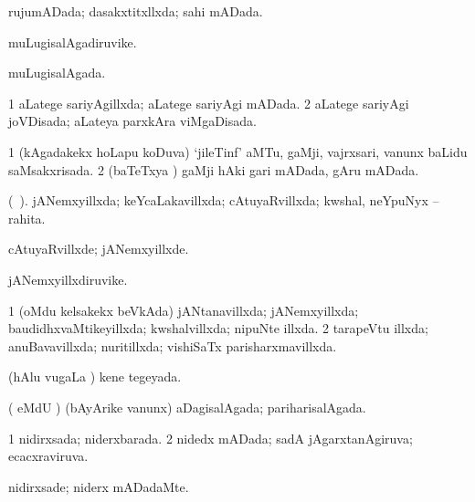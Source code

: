 {{\bentry
{} 
\gl{\gu}
\expl{}
\bmng
rujumADada; dasakxtitxllxda; sahi mADada. 
\emng
\eentry

\bentry
{} 
\gl{\nA}
\expl{}
\bmng
muLugisalAgadiruvike. 
\emng
\eentry

\bentry
{} 
\gl{\gu}
\expl{}
\bmng
muLugisalAgada. 
\emng
\eentry

\bentry
{} 
\gl{\gu}
\expl{}
\bmng
\bnum
\num{1} aLatege sariyAgillxda; aLatege sariyAgi mADada. 
\num{2} aLatege sariyAgi joVDisada; aLateya parxkAra viMgaDisada. 
\enum
\emng
\eentry

\bentry
{} 
\gl{\gu}
\expl{}
\bmng
\bnum
\num{1} (kAgadakekx hoLapu koDuva) `jileTinf' aMTu, gaMji, vajrxsari, \mo vanunx baLidu saMsakxrisada. 
\num{2} (baTeTxya \vi) gaMji hAki gari mADada, gAru mADada. 
\enum
\emng
\eentry

\bentry
{} 
\gl{\gu}
\expl{}
\bmng
(\ame\ ). jANemxyillxda; keYcaLakavillxda; cAtuyaRvillxda; kwshal, neYpuNyx -- rahita. 
\emng
\eentry

\bentry
{} 
\gl{\kirxvi}
\expl{}
\bmng
cAtuyaRvillxde; jANemxyillxde. 
\emng
\eentry

\bentry
{} 
\gl{\nA}
\expl{}
\bmng
jANemxyillxdiruvike. 
\emng
\eentry

\bentry
{} 
\gl{\gu}
\expl{}
\bmng
\bnum
\num{1} (oMdu kelsakekx beVkAda) jANtanavillxda; jANemxyillxda; baudidhxvaMtikeyillxda; kwshalvillxda; nipuNte illxda. 
\num{2} tarapeVtu illxda; anuBavavillxda; nuritillxda; vishiSaTx parisharxmavillxda. 
\enum
\emng
\eentry

\bentry
{} 
\gl{\gu}
\expl{}
\bmng
(hAlu \mo vugaLa \vi) kene tegeyada. 
\emng
\eentry

\bentry
{} 
\gl{\gu}
\expl{}
\bmng
( eMdU \parx) (bAyArike \mo vanunx) aDagisalAgada; pariharisalAgada. 
\emng
\eentry

\bentry
{} 
\gl{\gu}
\expl{}
\bmng
\bnum
\num{1} nidirxsada; niderxbarada. 
\num{2} nidedx mADada; sadA jAgarxtanAgiruva; ecacxraviruva. 
\enum
\emng
\eentry

\bentry
{} 
\gl{\kirxvi}
\expl{}
\bmng
nidirxsade; niderx mADadaMte. 
\emng
\eentry

}}
